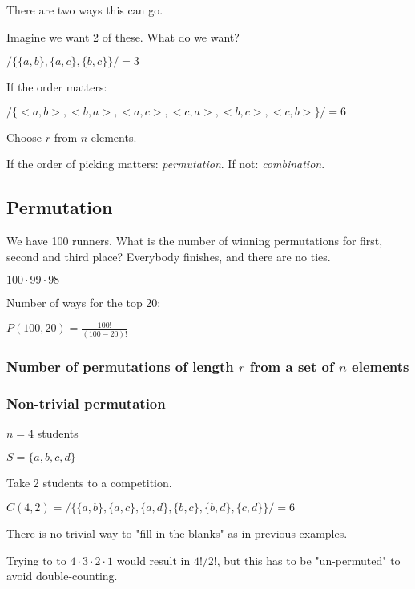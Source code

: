 \documentclass[english,openany]{book}
\begin{document}
    There are two ways this can go.

    Imagine we want 2 of these. What do we want?

    $/ \{ \{a,b\}, \{a,c\}, \{b,c\} \} / = 3$

    If the order matters:

    $/ \{   <a,b>, <b,a>, <a,c>, <c,a>, <b,c>, <c,b>  \} /  = 6$

    Choose $r$ from $n$ elements.

    If the order of picking matters: \textit{permutation}. If not: \textit{combination}.\\

    \subsection{Permutation}

    We have 100 runners. What is the number of winning permutations for first, second and third place? Everybody finishes, and there are no ties.

    $100 \cdot 99 \cdot 98$

    Number of ways for the top 20:

    $P(100,20) = \frac{100!}{(100-20)!}$

    \subsubsection{Number of permutations of length $r$ from a set of $n$ elements}

    \noindent{}

    \subsubsection{Non-trivial permutation}

    $n = 4$ students

    $S = \{a,b,c,d \}$

    Take 2 students to a competition.

    $C(4,2) = / \{ \{a,b\}, \{a,c\}, \{a,d\}, \{b, c\}, \{b,d\}, \{c,d\} \} / = 6$

    There is no trivial way to "fill in the blanks" as in previous examples.

    Trying to to $4 \cdot 3 \cdot 2 \cdot 1$ would result in $4!/2!$, but this has to be "un-permuted" to avoid double-counting.
\end{document}
